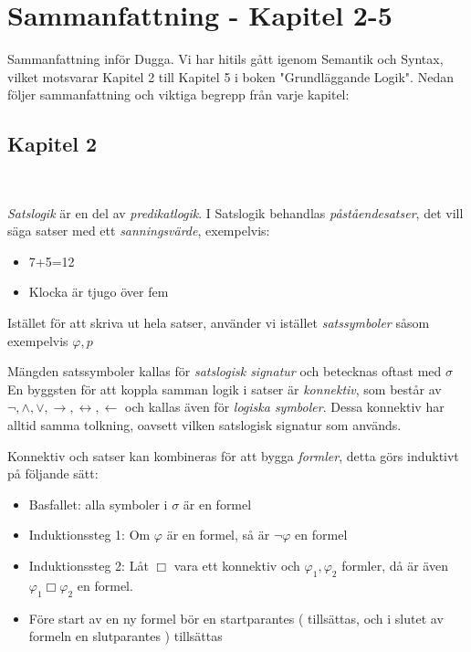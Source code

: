\section{Sammanfattning - Kapitel 2-5}
\par\bigskip
\noindent Sammanfattning inför Dugga. Vi har hitils gått igenom Semantik och Syntax, vilket motsvarar Kapitel 2 till Kapitel 5 i boken "Grundläggande Logik". Nedan följer sammanfattning och viktiga begrepp från varje kapitel:
\par\bigskip
\subsection{Kapitel 2}\hfill\\
\par\bigskip
\noindent\textit{Satslogik} är en del av \textit{predikatlogik}. I Satslogik behandlas \textit{påståendesatser}, det vill säga satser med ett \textit{sanningsvärde}, exempelvis:
\begin{itemize}
  \item 7+5=12
  \item Klocka är tjugo över fem
\end{itemize}
\par\bigskip
\noindent Istället för att skriva ut hela satser, använder vi istället \textit{satssymboler} såsom exempelvis $\varphi, p$\par\bigskip
\noindent Mängden satssymboler kallas för \textit{satslogisk signatur} och betecknas oftast med $\sigma$ 
\noindent En byggsten för att koppla samman logik i satser är \textit{konnektiv}, som består av $\neg,\wedge,\vee,\rightarrow,\leftrightarrow,\leftarrow$ och kallas även för \textit{logiska symboler}. Dessa konnektiv har alltid samma tolkning, oavsett vilken satslogisk signatur som används.
\par\bigskip

\noindent Konnektiv och satser kan kombineras för att bygga \textit{formler}, detta görs induktivt på följande sätt:
\begin{itemize}
  \item Basfallet: alla symboler i $\sigma$ är en formel
  \item Induktionssteg 1: Om $\varphi$ är en formel, så är $\neg\varphi$ en formel
  \item Induktionssteg 2: Låt $\Box$ vara ett konnektiv och $\varphi_1, \varphi_2$ formler, då är även $\varphi_1\Box\varphi_2$ en formel.
  \item Före start av en ny formel bör en startparantes ( tillsättas, och i slutet av formeln en slutparantes ) tillsättas 
\end{itemize}
\par\bigskip

